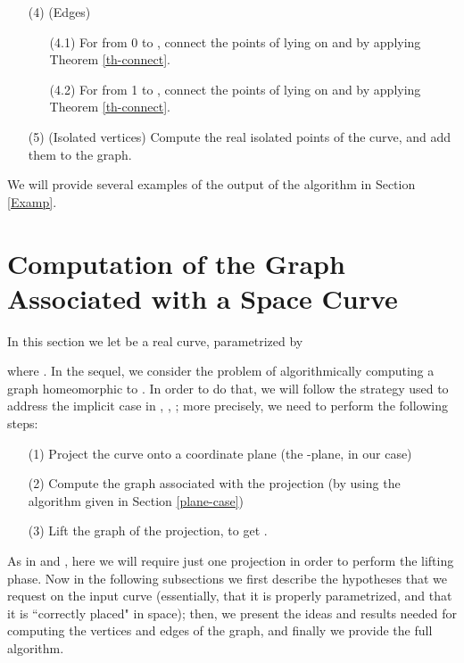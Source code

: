 \documentclass{elsart}
\begin{document}
\begin{itemize}
\begin{itemize}
        \end{itemize}
    \item [(4)] (Edges)
    \begin{itemize}
    \item [(4.1)] For  from 0 to , connect the points of  lying on  and  by applying Theorem \ref{th-connect}.
        \item [(4.2)] For  from 1 to , connect the points of  lying on  and  by applying Theorem \ref{th-connect}.
            \end{itemize}
            \item [(5)] (Isolated vertices) Compute the real isolated points of the curve, and add them to the graph.
\end{itemize}

We will provide several examples of the output of the algorithm in Section \ref{Examp}.


\section{Computation of the Graph Associated with a Space Curve}\label{sec-space}

In this section we let  be a real curve, parametrized by

where . In the sequel, we consider the problem of algorithmically computing a graph  homeomorphic to . In order to do that, we will follow the strategy used to address the implicit case in \cite{JG-Sendra}, \cite{Diat}, \cite{ElKa}; more precisely, we need to perform the following steps:
\begin{itemize}
\item [(1)] Project the curve onto a coordinate plane (the -plane, in our case)
 \item [(2)] Compute the graph  associated with the projection (by using the algorithm given in Section \ref{plane-case})
     \item [(3)] Lift the graph  of the projection, to get .
     \end{itemize}
     As in \cite{Diat} and \cite{ElKa}, here we will require just one projection
     in order to perform the lifting phase. Now in the following subsections we first describe the hypotheses that we request on the input curve (essentially, that it is properly parametrized, and that it is ``correctly placed" in space); then, we present the ideas and results needed for computing the vertices and edges of the graph, and finally we provide the full algorithm.
\end{document}
